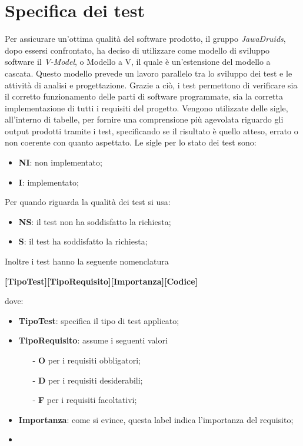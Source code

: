 \chapter{Specifica dei test} \label{SpecificaDeiTest}
Per assicurare un’ottima qualità del software prodotto, il gruppo \textit{JawaDruids}, dopo essersi confrontato, ha deciso di utilizzare come modello di sviluppo software il \textit{V-Model}, o Modello a V, il quale è un’estensione del modello a cascata.
Questo modello prevede un lavoro parallelo tra lo sviluppo dei test e le attività di analisi e progettazione.
Grazie a ciò, i test permettono di verificare sia il corretto funzionamento delle parti di software programmate, sia la corretta implementazione di tutti i requisiti del progetto.
Vengono utilizzate delle sigle, all’interno di tabelle, per fornire una comprensione più agevolata riguardo gli output prodotti tramite i test, specificando se il risultato è quello atteso, errato o non coerente con quanto aspettato.
Le sigle per lo stato dei test sono:
\begin{itemize}
	\item \textbf{NI}: non implementato;
	\item \textbf{I}: implementato;
\end{itemize}
Per quando riguarda la qualità dei test si usa:
\begin{itemize}
	\item \textbf{NS}: il test non ha soddisfatto la richiesta;
	\item \textbf{S}: il test ha soddisfatto la richiesta; 
\end{itemize}
Inoltre i test hanno la seguente nomenclatura
\begin{center}
	\textbf{[TipoTest][TipoRequisito][Importanza][Codice]}
\end{center}
dove:
\begin{itemize}
	\item \textbf{TipoTest}: specifica il tipo di test applicato;
	\item \textbf{TipoRequisito}: assume i seguenti valori
		\begin{itemize}
			\item[-] \textbf{O} per i requisiti obbligatori;
			\item[-] \textbf{D} per i requisiti desiderabili;
			\item[-] \textbf{F} per i requisiti facoltativi;
		\end{itemize}
	\item \textbf{Importanza}: come si evince, questa label indica l'importanza del requisito;
	\item 
\end{itemize}

